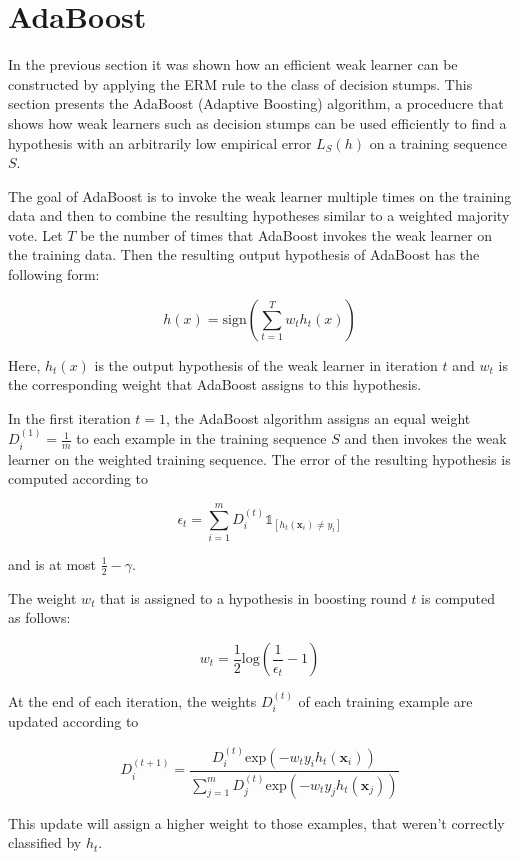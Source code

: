 \section{AdaBoost}
\label{sec:adaboost}

In the previous section it was shown how an efficient weak learner can be constructed by applying the ERM rule to
the class of decision stumps.
This section presents the AdaBoost (Adaptive Boosting) algorithm, a proceducre that shows 
how weak learners such as decision stumps can be
used efficiently to find a hypothesis with an arbitrarily low empirical error $L_S(h)$ on a training sequence $S$.

The goal of AdaBoost is to invoke the weak learner multiple times on the training data and then to combine
the resulting hypotheses similar to a weighted majority vote.
Let $T$ be the number of times that AdaBoost invokes the weak learner on the training data. Then the resulting
output hypothesis of AdaBoost has the following form:
\begin{linenomath*}
    $$
    h(x) = \text{sign}\left( \sum_{t=1}^T w_t h_t(x) \right)
    $$
\end{linenomath*}
Here, $h_t(x)$ is the output hypothesis of the weak learner in iteration $t$ and $w_t$ is the corresponding weight
that AdaBoost assigns to this hypothesis.

In the first iteration $t=1$, the AdaBoost algorithm assigns an equal weight $D_i^{(1)} = \frac{1}{m}$ to each example
in the training sequence $S$ and then invokes the weak learner on the weighted training sequence.
The error of the resulting hypothesis is computed according to
\begin{linenomath*}
    $$
    \epsilon_t = \sum_{i=1}^m D_i^{(t)} \mathds{1}_{\left[ h_t(\mathbf{x}_i) \neq y_i \right]}
    $$
\end{linenomath*}
and is at most $\frac{1}{2}-\gamma$.

The weight $w_t$ that is assigned to a hypothesis in boosting round $t$ is computed as follows:
\begin{linenomath*}
    $$
    w_t = \frac{1}{2} \text{log} \left( \frac{1}{\epsilon_t} - 1 \right)
    $$
\end{linenomath*}

At the end of each iteration, the weights $D_i^{(t)}$ of each training example are updated according to
\begin{linenomath*}
    $$
    D_i^{(t+1)} = \frac{D_i^{(t)} \text{exp} \left( -w_t y_i h_t(\mathbf{x}_i) \right)}{
        \sum_{j=1}^m D_j^{(t)} \text{exp} \left( -w_t y_j h_t(\mathbf{x}_j) \right) }
    $$
\end{linenomath*}
This update will assign a higher weight to those examples, that weren't correctly classified by $h_t$.
